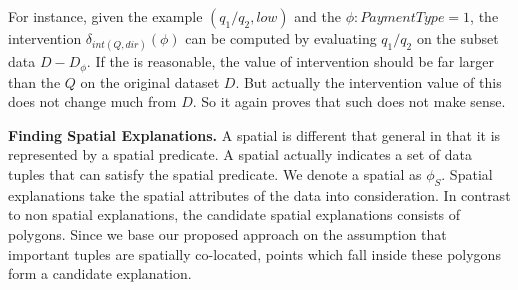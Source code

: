 For instance, given the example {\fact} $(q_1/q_2, low)$ and the {\explanation} $\phi: PaymentType = 1$, the intervention $\delta_{int(Q, dir)}(\phi)$ can be computed by evaluating $q_1/q_2$ on the subset data $D-D_\phi$. If the {\explanation} is reasonable, the value of intervention should be far larger than the $Q$ on the original dataset $D$. But actually the intervention value of this {\explanation} does not change much from $D$. So it again proves that such {\explanation} does not make sense.

{\bf Finding Spatial Explanations.}
A spatial {\explanation} is different that general {\explanation} in that it is represented by a spatial predicate. A spatial {\explanation} actually indicates a set of data tuples that can satisfy the spatial predicate. We denote a spatial {\explanation} as $\phi_S$.
Spatial explanations take the spatial attributes of the data into consideration. In contrast to non spatial explanations, the candidate spatial explanations consists of polygons. Since we base our proposed approach on the assumption that important tuples are spatially co-located, points which fall inside these polygons form a candidate explanation. 



